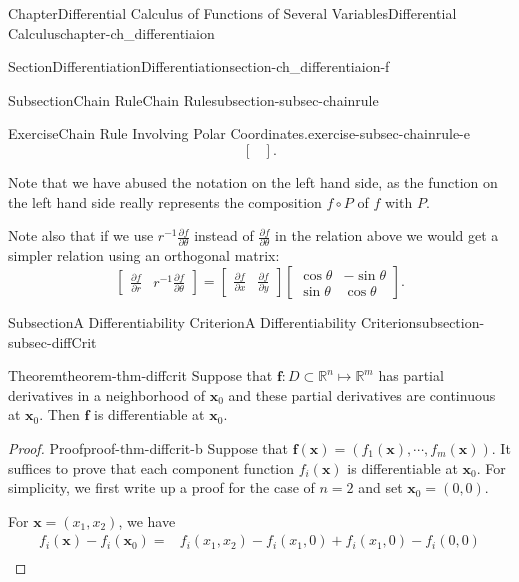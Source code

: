 \documentclass[oneside,10pt,]{book}
\numberwithin{equation}{section}
\newcommand{\bff}{\mathbf{f}}
\newcommand{\bx}{\mathbf{x}}
\newcommand{\bbR}{\mathbb{R}}
\newcommand{\amp}{&}
\begin{document}
\begin{chapterptx}{Chapter}{Differential Calculus of Functions of Several Variables}{}{Differential Calculus}{}{}{chapter-ch_differentiaion}
\begin{sectionptx}{Section}{Differentiation}{}{Differentiation}{}{}{section-ch_differentiaion-f}
\begin{subsectionptx}{Subsection}{Chain Rule}{}{Chain Rule}{}{}{subsection-subsec-chainrule}
\begin{inlineexercise}{Exercise}{Chain Rule Involving Polar Coordinates.}{exercise-subsec-chainrule-e}
\begin{equation*}
\begin{bmatrix}
\end{bmatrix}\text{.}
\end{equation*}
%
\par
Note that we have abused the notation on the left hand side, as the function on the left hand side really represents the composition \(f\circ P\) of \(f\) with \(P\).%
\par
Note also that if we use \(r^{-1}\frac{\partial f }{\partial \theta}\)  instead of \(\frac{\partial f}{\partial \theta}\) in the relation above we would get a simpler relation using an orthogonal matrix:%
\begin{equation*}
\begin{bmatrix} 
\frac{\partial f}{\partial r} & r^{-1} \frac{\partial f}{\partial \theta} 
\end{bmatrix} = \begin{bmatrix} 
\frac{\partial f}{\partial x} & \frac{\partial f}{\partial y} 
\end{bmatrix}  \begin{bmatrix} \cos \theta  & - \sin\theta \\ \sin\theta & \cos\theta
\end{bmatrix}\text{.}
\end{equation*}
%
\end{inlineexercise}%
\end{subsectionptx}
%
%
\typeout{************************************************}
\typeout{************************************************}
%
\begin{subsectionptx}{Subsection}{A Differentiability Criterion}{}{A Differentiability Criterion}{}{}{subsection-subsec-diffCrit}
\begin{theorem}{Theorem}{}{}{theorem-thm-diffcrit}%
Suppose that \(\mathbf f:D\subset \bbR^n\mapsto  \bbR^m\) has partial derivatives in a neighborhood of \(\bx_0\) and these partial derivatives are continuous at \(\bx_{0}\). Then \(\bff\) is differentiable at \(\bx_0\).%
\end{theorem}
\begin{proof}{Proof}{}{proof-thm-diffcrit-b}
Suppose that \(\bff (\bx)=(f_1(\bx),\cdots, f_m(\bx))\). It suffices to prove that each component function \(f_i(\bx)\) is differentiable at \(\bx_0\). For simplicity, we first write up a proof for the case of \(n=2\) and set \(\bx_0=(0, 0)\).%
\par
For \(\bx=(x_1, x_2)\), we have%
\begin{align*}
f_i(\bx)-f_i(\bx_0)=\amp f_i(x_1, x_2)-f_i(x_1, 0)+f_i(x_1, 0)-f_i(0, 0)\\

\end{align*}
\end{proof}
\end{subsectionptx}
\end{sectionptx}
\end{chapterptx}
\end{document}
